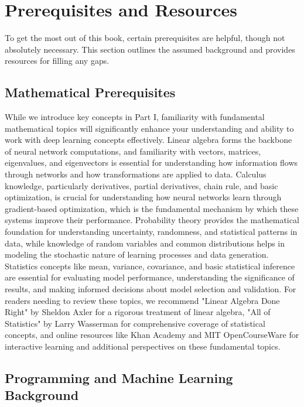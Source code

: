 
\section{Prerequisites and Resources }
\label{sec:prerequisites}

To get the most out of this book, certain prerequisites are helpful, though not absolutely necessary. This section outlines the assumed background and provides resources for filling any gaps.

\subsection{Mathematical Prerequisites}

While we introduce key concepts in Part I, familiarity with fundamental mathematical topics will significantly enhance your understanding and ability to work with deep learning concepts effectively. Linear algebra forms the backbone of neural network computations, and familiarity with vectors, matrices, eigenvalues, and eigenvectors is essential for understanding how information flows through networks and how transformations are applied to data. Calculus knowledge, particularly derivatives, partial derivatives, chain rule, and basic optimization, is crucial for understanding how neural networks learn through gradient-based optimization, which is the fundamental mechanism by which these systems improve their performance. Probability theory provides the mathematical foundation for understanding uncertainty, randomness, and statistical patterns in data, while knowledge of random variables and common distributions helps in modeling the stochastic nature of learning processes and data generation. Statistics concepts like mean, variance, covariance, and basic statistical inference are essential for evaluating model performance, understanding the significance of results, and making informed decisions about model selection and validation. For readers needing to review these topics, we recommend "Linear Algebra Done Right" by Sheldon Axler for a rigorous treatment of linear algebra, "All of Statistics" by Larry Wasserman for comprehensive coverage of statistical concepts, and online resources like Khan Academy and MIT OpenCourseWare for interactive learning and additional perspectives on these fundamental topics.

\subsection{Programming and Machine Learning Background}

